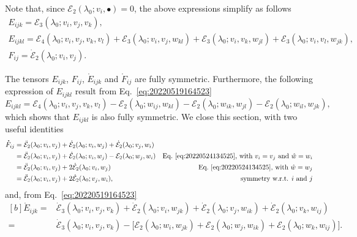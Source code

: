 \documentclass[12pt, final]{scrartcl}
\theoremstyle{definition}
\newcommand{\E}{\mathcal E}
\begin{document}
Note that, since $\E_2(\lambda_0; v_i, \bullet) = 0$, the above expressions simplify as follows
\begin{gather}
  \label{eq:20220524135619}
  E_{ijk} = \E_3(\lambda_0; v_i, v_j, v_k),\\
  \label{eq:20220524135553}
  E_{ijkl} = \E_4(\lambda_0 ; v_i, v_j, v_k, v_l) + \E_3(\lambda_0 ; v_i, v_j, w_{kl}) + \E_3(\lambda_0 ; v_i, v_k, w_{jl}) + \E_3(\lambda_0 ; v_i, v_l, w_{jk}),\\
  \label{eq:20220524135643}
  F_{ij} = \dot{\E}_2(\lambda_0; v_i, v_j).
\end{gather}

The tensors $E_{ijk}$, $F_{ij}$, $\mathring{E}_{ijk}$ and
$\mathring{F}_{ij}$ are fully symmetric. Furthermore, the following expression
of $E_{ijkl}$ result from Eq.~\eqref{eq:20220519164523}
\begin{equation}
  \label{eq:20220802081116}
  E_{ijkl} = \E_4(\lambda_0 ; v_i, v_j, v_k, v_l) - \E_2(\lambda_0 ; w_{ij}, w_{kl}) - \E_2(\lambda_0 ; w_{ik}, w_{jl}) - \E_2(\lambda_0 ; w_{il}, w_{jk}),
\end{equation}
which shows that $E_{ijkl}$ is also fully symmetric. We close this section,
with two useful identities
\begin{equation}
  \label{eq:20220617084433}
  \begin{aligned}[b]
    \mathring{F}_{ij} ={} & \ddot{\E}_2(\lambda_0; v_i, v_j) + \dot{\E}_2(\lambda_0; v_i, w_j) + \dot{\E}_2(\lambda_0; v_j, w_i)\\
    ={} & \ddot{\E}_2(\lambda_0; v_i, v_j) + \dot{\E}_2(\lambda_0; v_i, w_j) - \E_2(\lambda_0; w_j, w_i) & \text{Eq.~\eqref{eq:20220524134525}, with $v_i = v_j$ and $\hat{w} = w_i$}\\
    ={} & \ddot{\E}_2(\lambda_0; v_i, v_j)  + 2\dot{\E}_2(\lambda_0; v_i, w_j) & \text{Eq.~\eqref{eq:20220524134525}, with $\hat{w} = w_j$}\\
    ={} & \ddot{\E}_2(\lambda_0; v_i, v_j) + 2\dot{\E}_2(\lambda_0; v_j, w_i), & \text{symmetry w.r.t. $i$ and $j$}
  \end{aligned}
\end{equation}
and, from Eq.~\eqref{eq:20220519164523}
\begin{equation}
  \label{eq:20220617085256}
  \begin{aligned}[b]
  \mathring{E}_{ijk} ={}& \dot{\E}_3(\lambda_0; v_i, v_j, v_k) + \dot{\E}_2(\lambda_0; v_i, w_{jk}) + \dot{\E}_2(\lambda_0; v_j, w_{ik}) + \dot{\E}_2(\lambda_0; v_k, w_{ij})\\
  ={}& \dot{\E}_3(\lambda_0; v_i, v_j, v_k) - \bigl[\E_2(\lambda_0; w_i, w_{jk}) + \E_2(\lambda_0; w_j, w_{ik}) + \E_2(\lambda_0; w_k, w_{ij})\bigr].
  \end{aligned}
\end{equation}
\end{document}

